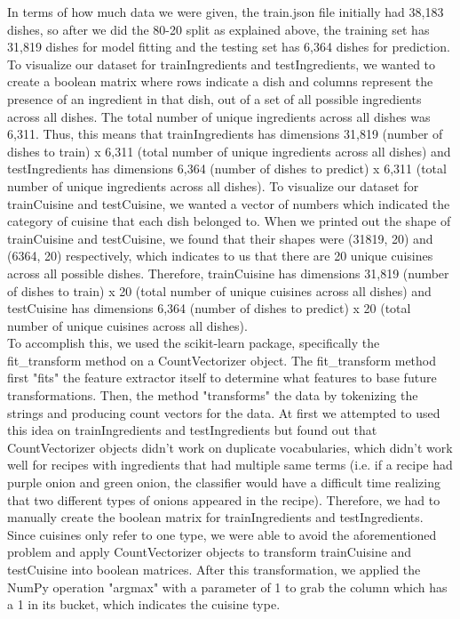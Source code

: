 \documentclass[11pt]{article}
\begin{document}
In terms of how much data we were given, the train.json file initially had
38,183 dishes, so after we did the 80-20 split as explained above, the training set
has 31,819 dishes for model fitting and the testing set has 6,364 dishes for prediction. To
visualize our dataset for trainIngredients and testIngredients, we wanted to create a boolean matrix where rows indicate
a dish and columns represent the presence of an ingredient in that dish, out of
a set of all possible ingredients across all dishes. The total number of unique
ingredients across all dishes was 6,311. Thus, this means that
trainIngredients has dimensions 31,819 (number of dishes to train) x 6,311 (total
number of unique ingredients across all dishes) and testIngredients has dimensions
6,364 (number of dishes to predict) x 6,311 (total
number of unique ingredients across all dishes). To visualize our dataset
for trainCuisine and testCuisine, we wanted a vector of numbers which indicated
the category of cuisine that each dish belonged to. When we printed out the shape
of trainCuisine and testCuisine, we found that their shapes were (31819, 20)
and (6364, 20) respectively, which indicates to us that there are 20 unique cuisines
across all possible dishes. Therefore, trainCuisine has dimensions 31,819
(number of dishes to train) x 20 (total number of unique cuisines across all dishes)
and testCuisine has dimensions 6,364
(number of dishes to predict) x 20 (total number of unique cuisines across all dishes). \\

To accomplish this, we used the scikit-learn package, specifically the fit\_transform
method on a CountVectorizer object. The fit\_transform method first "fits" the
feature extractor itself to determine what features to base future transformations.
Then, the method "transforms" the data by tokenizing the strings and producing
count vectors for the data. At first
we attempted to used this idea on trainIngredients and testIngredients but found
out that CountVectorizer objects didn't work on duplicate vocabularies, which
didn't work well for recipes with ingredients that had multiple same terms (i.e. if a
recipe had purple onion and green onion, the classifier would have a difficult time
realizing that two different types of onions appeared in the recipe). Therefore,
we had to manually create the boolean matrix for trainIngredients and testIngredients.
Since cuisines only refer to one type, we were able
to avoid the aforementioned problem and apply CountVectorizer objects to transform
trainCuisine and testCuisine into boolean matrices. After this transformation, we
applied the NumPy operation "argmax" with a parameter of 1 to grab the column
which has a 1 in its bucket, which indicates the cuisine type. \\
\end{document}
